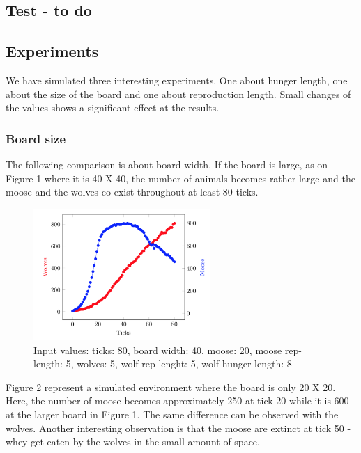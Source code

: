 \documentclass[a4paper]{report}
\begin{document}
\subsection*{Test - to do}

\subsection*{Experiments}
We have simulated three interesting experiments. One about hunger length, one about the size of the board and one about reproduction length. Small changes of the values shows a significant effect at the results. 

\subsubsection*{Board size}
The following comparison is about board width. If the board is large, as on Figure 1 where it is 40 X 40, the number of animals becomes rather large and the moose and the wolves co-exist throughout at least 80 ticks. 

\begin{figure}[H]
\centering
\includegraphics[width=0.60\textwidth]{Experiments/sim_board_b1}
\caption{Input values: ticks: 80, board width: 40, moose: 20, moose rep-length: 5, wolves: 5, wolf rep-lenght: 5, wolf hunger length: 8}
\end{figure}

Figure 2 represent a simulated environment where the board is only 20 X 20. Here, the number of moose becomes approximately 250 at tick 20 while it is 600 at the larger board in Figure 1. The same difference can be observed with the wolves. Another interesting observation is that the moose are extinct at tick 50 - whey get eaten by the wolves in the small amount of space. 
\end{document}
